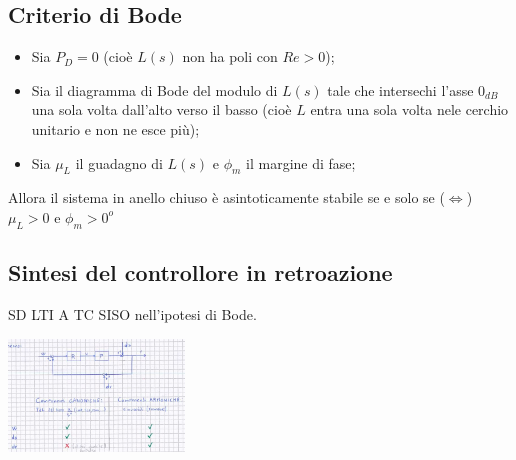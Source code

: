 \begin{landscape}
\begin{multicols*}{3}
    \subsection*{Criterio di Bode}
    \begin{itemize}
        \item Sia $P_D = 0$ (cioè $L(s)$ non ha poli con $Re > 0$);
        \item Sia il diagramma di Bode del modulo di $L(s)$ tale che intersechi l'asse $0_{dB}$ una sola volta dall'alto verso il basso (cioè $L$ entra una sola volta nele cerchio unitario e non ne esce più);
        \item Sia $\mu_L$ il guadagno di $L(s)$ e $\phi_m$ il margine di fase;
    \end{itemize}
    Allora il sistema in anello chiuso è asintoticamente stabile se e solo se ($\Leftrightarrow$) $\mu_L > 0$ e $\phi_m > 0^o$
    \subsection*{Sintesi del controllore in retroazione}
    SD LTI A TC SISO nell'ipotesi di Bode.
    \begin{center}
        \includegraphics[height=3cm]{../formulario/img2.JPG}
    \end{center}

\end{multicols*}
\end{landscape}
